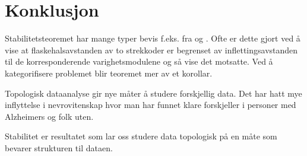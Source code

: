 \section{Konklusjon}
Stabilitetsteoremet har mange typer bevis f.eks. fra
\citep{Bauer2015} og \citep{Chazal2009}. Ofte er dette
gjort ved å vise at flaskehalsavstanden av to strekkoder
er begrenset av inflettingsavstanden til de
korresponderende varighetsmodulene og så vise det
motsatte. Ved å kategorifisere problemet blir teoremet mer
av et korollar.

Topologisk dataanalyse gir nye måter å studere
forskjellig data. Det har hatt mye inflyttelse
i nevrovitenskap hvor man har funnet klare forskjeller
i personer med Alzheimers og folk uten.

Stabilitet er resultatet som lar oss studere data
topologisk på en måte som bevarer strukturen til dataen.
